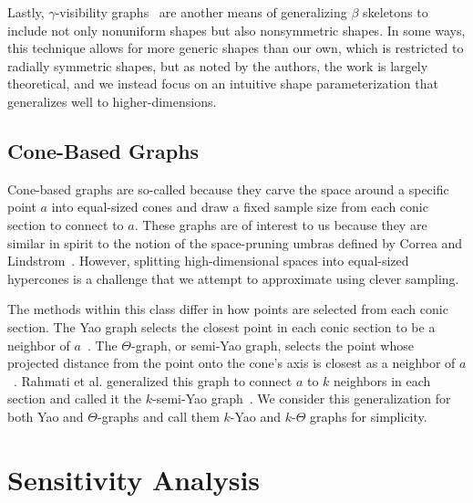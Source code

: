 Lastly, $\gamma$-visibility graphs~\cite{KatzTalBasri2007,KatzTal2015,KatzTal2017} are another means of generalizing $\beta$ skeletons to include not only nonuniform shapes but also nonsymmetric shapes.
%
In some ways, this technique allows for more generic shapes than our own, which is restricted to radially symmetric shapes, but as noted by the authors, the work is largely theoretical, and we instead focus on an intuitive shape parameterization that generalizes well to higher-dimensions.

\subsection{Cone-Based Graphs}
\label{sec:bg_cones}

Cone-based graphs are so-called because they carve the space around a specific point $a$ into equal-sized cones and draw a fixed sample size from each conic section to connect to $a$.
%
These graphs are of interest to us because they are similar in spirit to the notion of the space-pruning umbras defined by Correa and Lindstrom~\cite{CorreaLindstrom2011}.
%
However, splitting high-dimensional spaces into equal-sized hypercones is a challenge that we attempt to approximate using clever sampling.

The methods within this class differ in how points are selected from each conic section.
%
The Yao graph selects the closest point in each conic section to be a neighbor of $a$~\cite{Yao1982}.
%
The $\Theta$-graph, or semi-Yao graph, selects the point whose projected distance from the point onto the cone's axis is closest as a neighbor of $a$~\cite{Clarkson1987,Keil1988}.
%
Rahmati et al. generalized this graph to connect $a$ to $k$ neighbors in each section and called it the $k$-semi-Yao graph~\cite{RahmatiKingWhitesides2013}.
%
We consider this generalization for both Yao and $\Theta$-graphs and call them $k$-Yao and $k$-$\Theta$ graphs for simplicity.

\section{Sensitivity Analysis}
\label{sec:sensitivity}

